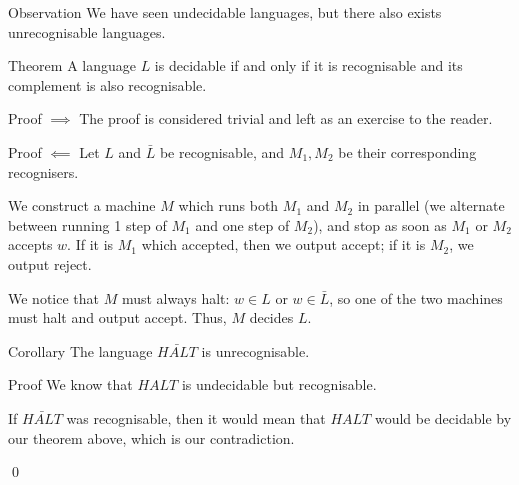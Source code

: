 \documentclass[a4paper]{article}
\begin{document}
\begin{parag}{Observation}
    We have seen undecidable languages, but there also exists unrecognisable languages.
\end{parag}

\begin{parag}{Theorem}
    A language $L$ is decidable if and only if it is recognisable and its complement is also recognisable.

    \begin{subparag}{Proof $\implies$}
        The proof is considered trivial and left as an exercise to the reader.
    \end{subparag}

    \begin{subparag}{Proof $\impliedby$}
        Let $L$ and $\bar{L}$ be recognisable, and $M_1, M_2$ be their corresponding recognisers.

        We construct a machine $M$ which runs both $M_1$ and $M_2$ in parallel (we alternate between running 1 step of $M_1$ and one step of $M_2$), and stop as soon as $M_1$ or $M_2$ accepts $w$. If it is $M_1$ which accepted, then we output accept; if it is $M_2$, we output reject.

        We notice that $M$ must always halt: $w \in L$ or $w \in \bar{L}$, so one of the two machines must halt and output accept. Thus, $M$ decides $L$.
    \end{subparag}
\end{parag}

\begin{parag}{Corollary}
    The language $\bar{HALT}$ is unrecognisable.

    \begin{subparag}{Proof}
        We know that $HALT$ is undecidable but recognisable.

        If $\bar{HALT}$ was recognisable, then it would mean that $HALT$ would be decidable by our theorem above, which is our contradiction.

        \qed
    \end{subparag}
    
\end{parag}
\end{document}

